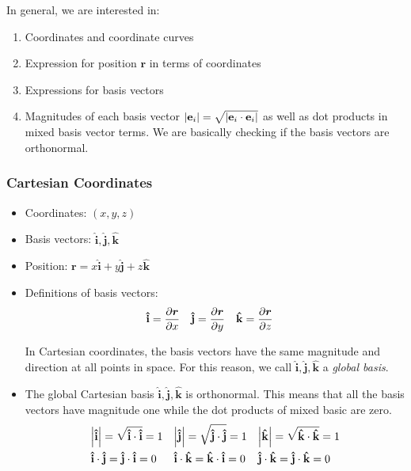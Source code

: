 \documentclass[11pt, a4paper]{article}
\newcommand{\e}{\mathbf{e}} %
\newcommand{\uvec}[1]{\bm{\hat{\mathbf{#1}}}} %
\begin{document}
In general, we are interested in:
\begin{enumerate}
	\item Coordinates and coordinate curves
	\item Expression for position $ \bm{r} $ in terms of coordinates
	\item Expressions for basis vectors
	\item Magnitudes of each basis vector $ \abs{\e_i} = \sqrt{\abs{\e_i \cdot \e_i}} $ as well as dot products in mixed basis vector terms. We are basically checking if the basis vectors are orthonormal.
\end{enumerate}

\subsubsection{Cartesian Coordinates}
\begin{itemize}	
	\item Coordinates: $ (x, y, z) $
	\item Basis vectors: $ \uvec i, \uvec j, \uvec k $
	\item Position: $ \bm{r} = x \uvec i + y \uvec j + z \uvec{k} $
	\item Definitions of basis vectors:
	\begin{align*}
		& \uvec i = \pdv{\bm{r}}{x} && \uvec j = \pdv{\bm{r}}{y} && \uvec k = \pdv{\bm{r}}{z}
	\end{align*}
	
	In Cartesian coordinates, the basis vectors have the same magnitude and direction at all points in space. For this reason, we call $ \uvec i, \uvec j, \uvec k $ a \textit{global basis}.
	
	\item The global Cartesian basis $  \uvec i, \uvec j, \uvec k $ is orthonormal. This means that all the basis vectors have magnitude one while the dot products of mixed basic are zero.
	\begin{align*}
		&\abs{\uvec i} = \sqrt{\uvec i \cdot \uvec i} = 1 && 	\abs{\uvec j} = \sqrt{\uvec j \cdot \uvec j} = 1 && 	\abs{\uvec k} = \sqrt{\uvec k \cdot \uvec k} = 1\\
		&\uvec{i} \cdot \uvec{j} = \uvec{j} \cdot \uvec{i} = 0 && \uvec{i} \cdot \uvec{k} = \uvec{k} \cdot \uvec{i} = 0 && \uvec{j} \cdot \uvec{k} = \uvec{j} \cdot \uvec{k}= 0
	\end{align*}
	
	
	
\end{itemize}
\end{document}

